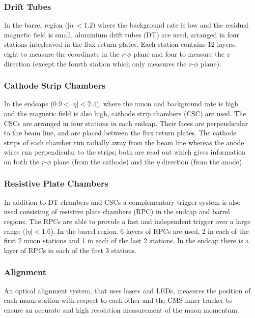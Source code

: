 \subsubsection{Drift Tubes}
In the barrel region ($|\eta| < 1.2$)
where the background rate is low and the residual magnetic field is small,
 aluminium drift tubes (DT) are used,
arranged in four stations interleaved in the flux return
plates. 
Each station contains 12 layers, eight to measure the coordinate in the
$r$-$\phi$ plane and four to measure the $z$ direction (except the fourth station
which only measures the $r$-$\phi$ plane). 

\subsubsection{Cathode Strip Chambers}
In the endcaps ($0.9<|\eta|<2.4$), where the muon and background rate is high and
the magnetic field is also high,
cathode strip chambers (CSC) are used. The
CSCs are arranged in four stations in each endcap. Their faces are perpendicular
to the beam line, and are placed between the flux return plates.  The cathode
strips of each chamber run radially away from the beam line whereas the anode
wires run perpendicular to the strips; both are read out which gives information
on both the $r$-$\phi$ plane (from the cathode) and the $\eta$ direction (from the
anode). \cite{chatrchyan2008cms}

\subsubsection{Resistive Plate Chambers}
In addition to DT chambers and CSCs a complementary trigger system is also used
consisting of resistive plate chambers (RPC) in the endcap and barrel regions.
The RPCs are able to provide a fast and independent trigger over a large range
($|\eta| < 1.6$). In the barrel region, 6 layers of RPCs are used, 2 in each of
the first 2 muon stations and 1 in each of the last 2 stations. In the endcap
there is a layer of RPCs in each of the first 3 stations.

\subsubsection{Alignment}
An optical alignment system, that uses lasers and LEDs, measures the position
of each muon station with respect to each other and the CMS inner tracker to
ensure an accurate and high resolution measurement of the muon
momentum.\cite{chatrchyan2008cms}

